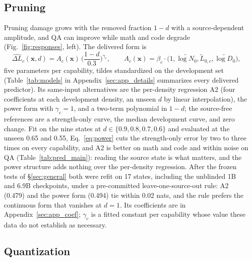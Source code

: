 \subsection{Pruning}
\label{sec:law_prune}

Pruning damage grows with the removed fraction $1-d$ with a
source-dependent amplitude, and QA can improve while math and code
degrade (Fig.~\ref{fig:responses}, left). The delivered form is
\begin{equation}
\widehat{\Delta L}_c(\mathbf x,d)=A_c(\mathbf x)\,\Big(\frac{1-d}{0.3}\Big)^{\gamma_c},
\qquad
A_c(\mathbf x)=\beta_c\cdot\big(1,\tilde{\log N_0},\tilde L_{0,c},\tilde{\log D_0}\big),
\label{eq:power}
\end{equation}
five parameters per capability, tildes standardized on the development
set (Table~\ref{tab:models} in Appendix~\ref{sec:app_details}
summarizes every delivered predictor). Its
same-input alternatives are the per-density regression A2 (four
coefficients at each development density, an unseen $d$ by linear
interpolation), the power form with $\gamma_c=1$, and a two-term
polynomial in $1-d$; the source-free references are a strength-only
curve, the median development curve, and zero change. Fit on the nine
states at $d\in\{0.9,0.8,0.7,0.6\}$ and evaluated at the unseen 0.65
and 0.55, Eq.~\eqref{eq:power} cuts the strength-only error by two to
three times on every capability, and A2 is better on math and code
and within noise on QA (Table~\ref{tab:pred_main}): reading the source
state is what matters, and the power structure adds nothing over the
per-density regression. After the frozen tests of \S\ref{sec:general}
both were refit on 17 states, including the unblinded 1B and 6.9B
checkpoints, under a pre-committed leave-one-source-out rule: A2
(0.479) and the power form (0.494) tie within 0.02 nats, and the rule
prefers the continuous form that vanishes at $d=1$. Its coefficients
are in Appendix~\ref{sec:app_coef}; $\gamma_c$ is a fitted constant
per capability whose value these data do not establish as necessary.

\subsection{Quantization}
\label{sec:law_quant}

